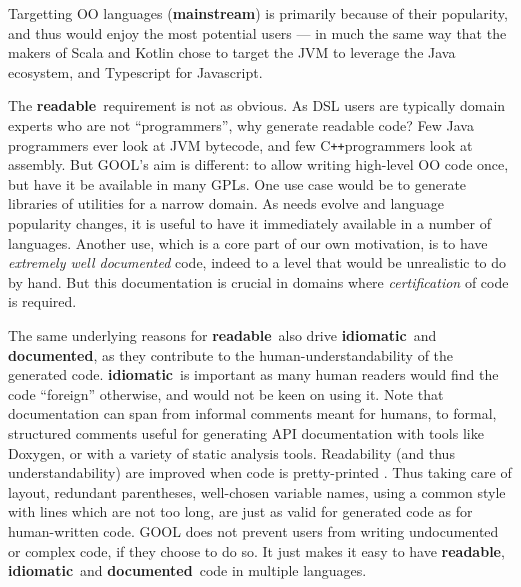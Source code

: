 \documentclass[sigplan,review,anonymous,prologue,dvipsnames]{acmart}
\newcommand{\Cplusplus}{C\texttt{++}}
\newcommand{\abbrev}[1]{\textbf{#1}}
\newcommand{\mainstream}{\abbrev{mainstream}}
\newcommand{\readable}{\abbrev{readable}}
\newcommand{\idiomatic}{\abbrev{idiomatic}}
\newcommand{\documented}{\abbrev{documented}}
\begin{document}
Targetting OO languages (\mainstream) is primarily because of their popularity, and thus
would enjoy the most potential users --- in much the same way that the makers
of Scala and Kotlin chose to target the JVM to leverage the Java ecosystem, and
Typescript for Javascript.

The \readable~requirement is not as obvious. As DSL users are typically
domain experts who are not ``programmers'', why generate readable code?
Few Java programmers ever look at JVM bytecode, and few \Cplusplus programmers
look at assembly. But GOOL's aim is different: to allow writing
high-level OO code once, but have it be available in many GPLs. One use case
would be to generate libraries of utilities for a narrow domain. As needs
evolve and language popularity changes, it is useful to have it immediately
available in a number of languages. Another use, which is a core part of our
own motivation, is to have \emph{extremely well documented} code, indeed to
a level that would be unrealistic to do by hand. But this documentation is
crucial in domains where \emph{certification} of code is required.

The same underlying reasons for \readable~also drive \idiomatic~and \documented,
as they contribute to the human-understandability of the generated code.
\idiomatic~is important as many human readers would find the code ``foreign''
otherwise, and would not be keen on using it.
Note that documentation can span from informal comments meant for humans, to
formal, structured comments useful for generating API documentation with tools
like Doxygen, or with a variety of static analysis tools.
Readability (and thus understandability) are improved when code is pretty-printed%
\cite{buse2009learning}. Thus taking care of layout, redundant parentheses,
well-chosen variable names, using a common style with lines which are not too
long, are just as valid for generated code as for human-written code.
GOOL does not prevent users from writing undocumented or complex code, if they
choose to do so. It just makes it easy to have \readable, \idiomatic~and
\documented~code in multiple languages.
\end{document}
